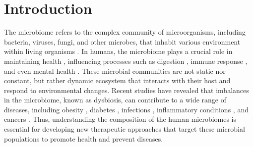 \documentclass[11pt, a4paper, onecolumn, oneside]{report}
\begin{document}
    \section{Introduction}
        The microbiome refers to the complex community of microorganisms, including bacteria, viruses, fungi, and other microbes, that inhabit various environment within living organisms \cite{microbiome-1, microbiome-3}. In humans, the microbiome plays a crucial role in maintaining health \cite{microbiome-2}, influencing processes such as digestion \cite{microbiome-digestion-1}, immune response \cite{microbiome-immune-1, microbiome-immune-2, microbiome-immune-3}, and even mental health \cite{microbiome-mental-1, microbiome-mental-2, microbiome-mental-3}. These microbial communities are not static nor constant, but rather dynamic ecosystem that interacts with their host and respond to environmental changes. Recent studies have revealed that imbalances in the microbiome, known as dysbiosis, can contribute to a wide range of diseases, including obesity \cite{microbiome-obesity-1, microbiome-obesity-2, microbiome-obesity-3}, diabetes \cite{microbiome-diabetes-1, microbiome-diabetes-2, microbiome-diabetes-3}, infections \cite{microbiome-infection-1, microbiome-infection-2}, inflammatory conditions \cite{microbiome-inflammation-1, microbiome-inflammation-2, microbiome-inflammation-3}, and cancers \cite{microbiome-cancer-1, microbiome-cancer-2, microbiome-cancer-3, microbiome-cancer-4}. Thus, understanding the composition of the human microbiomes is essential for developing new therapeutic approaches that target these microbial populations to promote health and prevent diseases.
\end{document}
